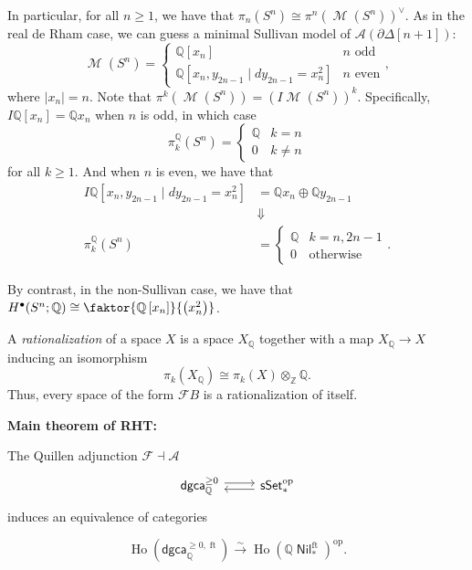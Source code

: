 \documentclass[10pt,letterpaper,cm]{nupset}
\theoremstyle{definition}
\theoremstyle{theorem}
\theoremstyle{remark}
\newcommand{\A}{\mathcal A}
\newcommand{\F}{\mathcal F}
\newcommand{\Q}{\mathbb Q}
\newcommand{\Z}{\mathbb Z}
\newcommand{\1}{\mathbb{1}}
\newcommand{\dgca}{\mathsf{dgca}}
\newcommand{\0}{\vec 0}
\DeclareMathOperator{\ft}{ft}
\DeclareMathOperator{\ho}{Ho}
\DeclareMathOperator{\M}{\mathcal{M}}
\DeclareMathOperator{\nil}{\mathsf{Nil}}
\DeclareMathOperator{\op}{op}
\begin{document}
In particular, for all $n \geq 1$, we have that $\pi_n(S^n) \cong \pi^n(\M(S^n))^{\vee}$. As in the real de Rham case, we can guess a minimal Sullivan model of $\A(\partial{\Delta\left[n+1\right]})$:
\[
\M(S^n) = \begin{cases}
\Q\left[x_n\right] & n \text{ odd}
\\ \Q\left[x_n, y_{2n-1} \mid d{y_{2n-1}} = x_n^2\right] & n \text{ even}
\end{cases},
\] where $\left\lvert{x_n}\right\rvert = n$. Note that $\pi^k(\M(S^n)) = \left(I{\M(S^n)}\right)^k$. Specifically, $I{\Q\left[x_n\right]} = \Q{x_n}$ when $n$ is odd, in which case
\[
\pi_k^{\Q}(S^n) = \begin{cases}
\Q & k = n
\\ 0 & k \ne n
\end{cases}
\] for all $k \geq 1$. And when $n$ is even, we have that 
\begin{align*}
I{ \Q\left[x_n, y_{2n-1} \mid d{y_{2n-1}} = x_n^2\right] } & = \Q{x_n} \oplus \Q{y_{2n-1}}
\\ & \Downarrow
\\ \pi_k^{\Q}(S^n) & = \begin{cases}
\Q & k = n, 2n-1
\\ 0 &  \text{otherwise}
\end{cases}.
\end{align*}

By contrast, in the non-Sullivan case, we have that $H^{\bullet}(S^n; \Q) \cong \faktor{\Q\left[x_n\right]}{\left(x_n^2\right)}$.

\medskip

A \textit{rationalization} of a space $X$ is a space $X_{\Q}$ together with a map $X_{\Q} \to X$ inducing an isomorphism
\[
\pi_k(X_{\Q}) \cong \pi_k(X) \otimes_{\Z} \Q.
\] Thus, every space of the form $\F{B}$ is a rationalization of itself. 

\bigskip

\textbf{Main theorem of RHT:}

\medskip

The Quillen adjunction  $\F \dashv  \A$
\[
\begin{tikzcd}
	{\dgca_{\Q}^{\geq 0}} & {\mathsf{sSet}_{\ast}^{\op}}
	\arrow[shift left=1, from=1-1, to=1-2]
	\arrow[shift left=1, from=1-2, to=1-1]
\end{tikzcd} 
\]
induces an equivalence of categories

\[  
\ho(\dgca_{\Q}^{\geq 0, \ft}) \xrightarrow{\sim} \ho(\Q{\nil}_{\ast}^{\ft})^{\op}
.\]
\end{document}
